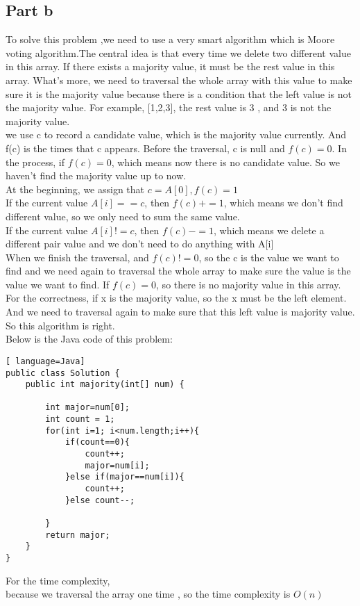 \documentclass[paper=a4, fontsize=11pt]{scrartcl} %
\numberwithin{equation}{section} %
\numberwithin{figure}{section} %
\numberwithin{table}{section} %
\begin{document}
\subsection{Part b}
To solve this problem ,we need to use a very smart algorithm which is Moore voting algorithm.The central idea is that every time we delete two different value in this array. If there exists a majority value, it must be the rest value in this array. What's more, we need to traversal the whole array with this value to make sure it is the majority value because there is a condition that the left value is not the majority value. For example, [1,2,3], the rest value is 3 , and 3 is not the majority value.\\
we use c to record a candidate value, which is the majority value currently. And f(c) is the times that c appears. Before the traversal, c is null and $f(c)=0$. In the process, if $f(c)=0$, which means now there is no candidate value. So we haven't find the majority value up to now. \\
At the beginning, we assign that $c=A[0], f(c)=1$\\
If the current value $A[i]==c$, then $f(c)+=1$, which means we don't find different value, so we only need to sum the same value.\\
If the current value $A[i]!=c$, then $f(c)-=1$, which means we delete a different pair value and we don't need to do anything with A[i]\\
When we finish the traversal, and $f(c)!=0$, so the c is the value we want to find and we need again to traversal the whole array to make sure the value is the value we want to find. If $f(c)=0$, so there is no majority value in this array.\\
For the correctness, if x is the majority value, so the x must be the left element. And we need to traversal again to make sure that this left value is majority value. So this algorithm is right.\\
Below is the Java code of this problem:\\
\begin{lstlisting}[ language=Java]
public class Solution {
    public int majority(int[] num) {

        int major=num[0];
        int count = 1;
        for(int i=1; i<num.length;i++){
            if(count==0){
                count++;
                major=num[i];
            }else if(major==num[i]){
                count++;
            }else count--;

        }
        return major;
    }
}
\end{lstlisting}
For the time complexity, \\
because we traversal the array one time , so the time complexity is $O(n)$\\
\end{document}
